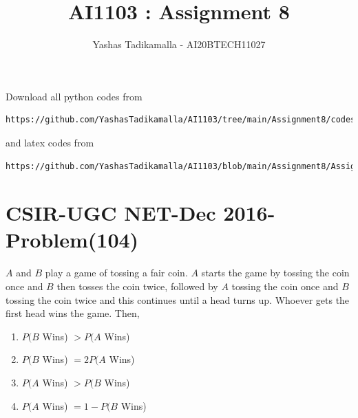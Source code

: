 \documentclass[journal,12pt,twocolumn]{IEEEtran}
\begin{document}
\let\vec\mathbf
\renewcommand{\thefigure}{\theproblem}
\def\putbox#1#2#3{\makebox[0in][l]{\makebox[#1][l]{}\raisebox{\baselineskip}[0in][0in]{\raisebox{#2}[0in][0in]{#3}}}}
     \def\rightbox#1{\makebox[0in][r]{#1}}
     \def\centbox#1{\makebox[0in]{#1}}
     \def\topbox#1{\raisebox{-\baselineskip}[0in][0in]{#1}}
     \def\midbox#1{\raisebox{-0.5\baselineskip}[0in][0in]{#1}}
\vspace{3cm}
\title{AI1103 : Assignment 8}
\author{Yashas Tadikamalla - AI20BTECH11027}
\maketitle
\newpage
\bigskip
\renewcommand{\thefigure}{\arabic{figure}}
\renewcommand{\thetable}{\arabic{table}}
Download all python codes from 
\begin{lstlisting}
https://github.com/YashasTadikamalla/AI1103/tree/main/Assignment8/codes
\end{lstlisting}
%
and latex codes from 
%
\begin{lstlisting}
https://github.com/YashasTadikamalla/AI1103/blob/main/Assignment8/Assignment8.tex
\end{lstlisting}
\section*{CSIR-UGC NET-Dec 2016-Problem(104)}
$A$ and $B$ play a game of tossing a fair coin. $A$ starts the game by tossing the coin once and $B$ then tosses the coin twice, followed by $A$ tossing the coin once and $B$ tossing the coin twice and this continues until a head turns up. Whoever gets the first head wins the game. Then, 
\begin{enumerate}
    \item $P(B$ Wins) $> P(A$ Wins)
    \item $P(B$ Wins) $= 2P(A$ Wins)
    \item $P(A$ Wins) $> P(B$ Wins)
    \item $P(A$ Wins) $= 1-P(B$ Wins)
\end{enumerate}
\end{document}
